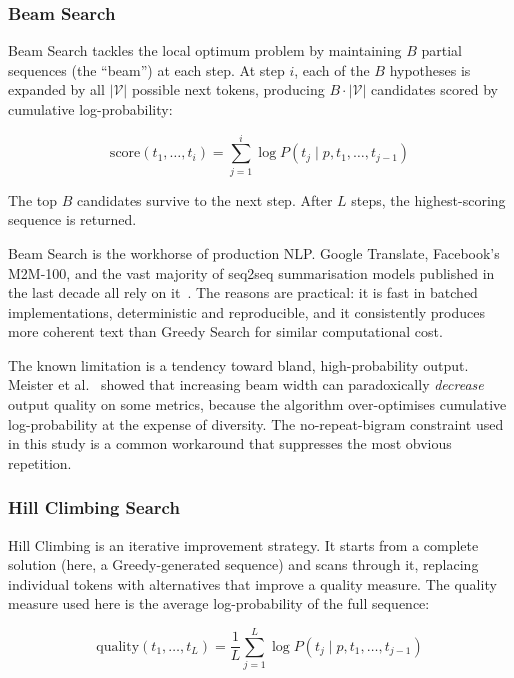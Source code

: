 \documentclass[12pt]{article}
\begin{document}
	\subsubsection{Beam Search}
	\label{sec:beam_theory}
	
	Beam Search tackles the local optimum problem by maintaining $B$ partial sequences (the ``beam'') at each step. At step $i$, each of the $B$ hypotheses is expanded by all $|\mathcal{V}|$ possible next tokens, producing $B \cdot |\mathcal{V}|$ candidates scored by cumulative log-probability:
	
	\begin{equation}
		\mathrm{score}(t_1, \ldots, t_i) = \sum_{j=1}^{i} \log P(t_j \mid p, t_1, \ldots, t_{j-1})
		\label{eq:beam_score}
	\end{equation}
	
	The top $B$ candidates survive to the next step. After $L$ steps, the highest-scoring sequence is returned.
	
	Beam Search is the workhorse of production NLP. Google Translate, Facebook's M2M-100, and the vast majority of seq2seq summarisation models published in the last decade all rely on it~\cite{cho2014rnnencoder, see2017pointer}. The reasons are practical: it is fast in batched implementations, deterministic and reproducible, and it consistently produces more coherent text than Greedy Search for similar computational cost.
	
	The known limitation is a tendency toward bland, high-probability output. Meister et al.~\cite{meister2020beam} showed that increasing beam width can paradoxically \emph{decrease} output quality on some metrics, because the algorithm over-optimises cumulative log-probability at the expense of diversity. The no-repeat-bigram constraint used in this study is a common workaround that suppresses the most obvious repetition.
	
	\subsubsection{Hill Climbing Search}
	\label{sec:hillclimb_theory}
	
	Hill Climbing is an iterative improvement strategy. It starts from a complete solution (here, a Greedy-generated sequence) and scans through it, replacing individual tokens with alternatives that improve a quality measure. The quality measure used here is the average log-probability of the full sequence:
	
	\begin{equation}
		\mathrm{quality}(t_1, \ldots, t_L) = \frac{1}{L}\sum_{j=1}^{L}
		\log P(t_j \mid p, t_1, \ldots, t_{j-1})
		\label{eq:hill_quality}
	\end{equation}
	
\end{document}
